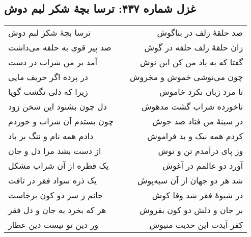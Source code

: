 \begin{center}
\section*{غزل شماره ۴۳۷: ترسا بچهٔ شکر لبم دوش}
\label{sec:437}
\begin{longtable}{l p{0.5cm} r}
ترسا بچهٔ شکر لبم دوش
&&
صد حلقهٔ زلف در بناگوش
\\
صد پیر قوی به حلقه می‌داشت
&&
زان حلقهٔ زلف حلقه در گوش
\\
آمد بر من شراب در دست
&&
گفتا که به یاد من کن این نوش
\\
در پرده اگر حریف مایی
&&
چون می‌نوشی خموش و مخروش
\\
زیرا که دلی نگشت گویا
&&
تا مرد زبان نکرد خاموش
\\
دل چون بشنود این سخن زود
&&
ناخورده شراب گشت مدهوش
\\
چون بستدم آن شراب و خوردم
&&
در سینهٔ من فتاد صد جوش
\\
دادم همه نام و ننگ بر باد
&&
کردم همه نیک و بد فراموش
\\
از دست بشد مرا دل و جان
&&
وز پای درآمدم تن و توش
\\
یک قطره از آن شراب مشکل
&&
آورد دو عالمم در آغوش
\\
یک ذره سواد فقر در تافت
&&
شد هر دو جهان از آن سیه‌پوش
\\
جانم ز سر دو کون برخاست
&&
در شیوهٔ فقر شد وفا کوش
\\
هر که بخرد به جان و دل فقر
&&
بر جان و دلش دو کون بفروش
\\
ور دین تو نیست دین عطار
&&
کفر آیدت این حدیث منیوش
\\
\end{longtable}
\end{center}
